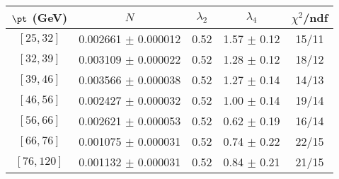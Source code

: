 \begin{tabular}{c||c|c|c|c}
$\pt$ (GeV) & $N$ & $\lambda_{2}$ & $\lambda_4$  & $\chi^2$/ndf  \\
\hline
$[25, 32]$ & 0.002661 $\pm$ 0.000012 & 0.52 & 1.57 $\pm$ 0.12 & 15/11\\
$[32, 39]$ & 0.003109 $\pm$ 0.000022 & 0.52 & 1.28 $\pm$ 0.12 & 18/12\\
$[39, 46]$ & 0.003566 $\pm$ 0.000038 & 0.52 & 1.27 $\pm$ 0.14 & 14/13\\
$[46, 56]$ & 0.002427 $\pm$ 0.000032 & 0.52 & 1.00 $\pm$ 0.14 & 19/14\\
$[56, 66]$ & 0.002621 $\pm$ 0.000053 & 0.52 & 0.62 $\pm$ 0.19 & 16/14\\
$[66, 76]$ & 0.001075 $\pm$ 0.000031 & 0.52 & 0.74 $\pm$ 0.22 & 22/15\\
$[76, 120]$ & 0.001132 $\pm$ 0.000031 & 0.52 & 0.84 $\pm$ 0.21 & 21/15\\
\end{tabular}
